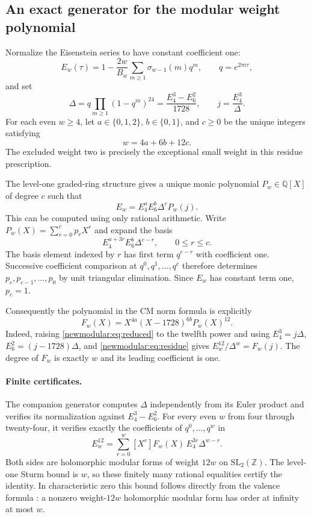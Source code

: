 \subsection{An exact generator for the modular weight polynomial}
\label{newmodular:sec:generator}

Normalize the Eisenstein series to have constant coefficient one:
\[
 E_w(\tau)=1-\frac{2w}{B_w}\sum_{m\ge1}\sigma_{w-1}(m)q^m,
 \qquad q=e^{2\pi i\tau},
\]
and set
\[
 \Delta=q\prod_{m\ge1}(1-q^m)^{24}
       =\frac{E_4^3-E_6^2}{1728},\qquad j=\frac{E_4^3}{\Delta}.
\]
For each even $w\ge4$, let $a\in\{0,1,2\}$, $b\in\{0,1\}$, and
$c\ge0$ be the unique integers satisfying
\begin{equation}\label{newmodular:eq:residue}
 w=4a+6b+12c.
\end{equation}
The excluded weight two is precisely the exceptional small weight in
this residue prescription.

The level-one graded-ring structure \cite{cmnorm:Stein} gives a unique monic polynomial
$P_w\in\mathbb Q[X]$ of degree $c$ such that
\begin{equation}\label{newmodular:eq:reduced}
 E_w=E_4^aE_6^b\Delta^cP_w(j).
\end{equation}
This can be computed using only rational arithmetic.  Write
$P_w(X)=\sum_{r=0}^c p_rX^r$ and expand the basis
\[
 E_4^{a+3r}E_6^b\Delta^{c-r},\qquad 0\le r\le c.
\]
The basis element indexed by $r$ has first term $q^{c-r}$ with
coefficient one.  Successive coefficient comparison at
$q^0,q^1,\ldots,q^c$ therefore determines $p_c,p_{c-1},\ldots,p_0$
by unit triangular elimination.  Since $E_w$ has constant term one,
$p_c=1$.

Consequently the polynomial in the CM norm formula is explicitly
\begin{equation}\label{newmodular:eq:F-factor}
 \boxed{\displaystyle
 F_w(X)=X^{4a}(X-1728)^{6b}P_w(X)^{12}.}
\end{equation}
Indeed, raising \eqref{newmodular:eq:reduced} to the twelfth power and
using $E_4^3=j\Delta$, $E_6^2=(j-1728)\Delta$, and
\eqref{newmodular:eq:residue} gives
$E_w^{12}/\Delta^w=F_w(j)$.  The degree of $F_w$ is exactly $w$
and its leading coefficient is one.

\paragraph{Finite certificates.}
The companion generator computes $\Delta$ independently from its Euler
product and verifies its normalization against $E_4^3-E_6^2$.
For every even $w$ from four through twenty-four, it verifies exactly
the coefficients of $q^0,\ldots,q^w$ in
\begin{equation}\label{newmodular:eq:cleared}
 E_w^{12}=\sum_{r=0}^{w}[X^r]F_w(X)\,
                     E_4^{3r}\Delta^{w-r}.
\end{equation}
Both sides are holomorphic modular forms of weight $12w$ on
$\mathrm{SL}_2(\mathbb Z)$.  The level-one Sturm bound is $w$, so
these finitely many rational equalities certify the identity.  In
characteristic zero this bound follows directly from the valence
formula \cite[Theorem 2.11]{cmnorm:Stein}: a nonzero weight-$12w$ holomorphic modular form has order
at infinity at most $w$.

